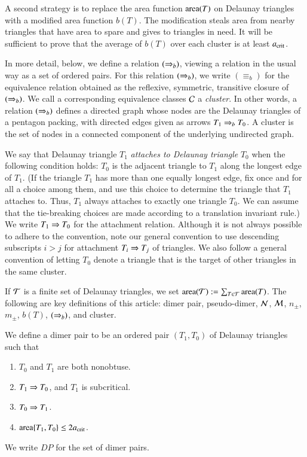 A second strategy is to replace the area function ${\operatorname{area}}(T)$ on
Delaunay triangles with a modified area function $b(T)$.  The
modification steals area from nearby triangles that have area to spare
and gives to triangles in need.  It will be sufficient to prove that
the average of $b(T)$ over each cluster is at least $a_\text{crit}$.

In more detail, below, we define a  relation $(\Rightarrow_{b})$, viewing
a relation in the usual way as a set of ordered pairs.  For 
this relation $(\Rightarrow_{b})$, we write ${(\equiv_{b})}$ for the equivalence
relation obtained as the reflexive, symmetric, transitive closure of
$(\Rightarrow_{b})$.  We call a corresponding equivalence classes $\mathcal C$ a
{\it cluster}.  In other words, a relation $(\Rightarrow_{b})$ defines a directed
graph whose nodes are the Delaunay triangles of a pentagon packing,
with directed edges given as arrows $T_1\Rightarrow_{b} T_0$.  A cluster
is the set of nodes in a connected component of the underlying
undirected graph.

We say that Delaunay triangle $T_1$ {\it attaches to Delaunay
  triangle} $T_0$ when the following condition holds: $T_0$ is the
adjacent triangle to $T_1$ along the longest edge of $T_1$.  (If the
triangle $T_1$ has more than one equally longest edge, fix once and
for all a choice among them, and use this choice to determine the
triangle that $T_1$ attaches to.  Thus, $T_1$ always attaches to
exactly one triangle $T_0$.  We can assume that the tie-breaking
choices are made according to a translation invariant rule.)  We write
$T_1 \Rightarrow T_0$ for the attachment relation.  Although it is not always
possible to adhere to the convention, note our general convention to
use descending subscripts $i > j$ for attachment $T_i\Rightarrow T_j$ of
triangles.  We also follow a general convention of letting $T_0$ denote
a triangle that is the target of other triangles in the same cluster.

If $\mathcal T$ is a finite set of Delaunay triangles, we set
${\operatorname{area}}(\mathcal T):=\sum_{T\in\mathcal T} {\operatorname{area}}(T)$.  The following are key
definitions of this article: dimer pair, pseudo-dimer, $\mathcal N$, $\mathcal M$,
$n_\pm$, $m_\pm$, $b(T)$, $(\Rightarrow_{b})$, and cluster.

\begin{definition}
  We define a dimer pair to be an ordered pair $(T_1,T_0)$ of Delaunay
  triangles such that
\begin{enumerate}
\item $T_0$ and $T_1$ are both nonobtuse.
\item $T_1\Rightarrow T_0$, and $T_1$ is subcritical.
\item $T_0 \Rightarrow T_1$.
\item ${\operatorname{area}}\{T_1,T_0\} \le 2a_\text{crit}$.
\end{enumerate}
We write $DP$ for the set of dimer pairs.
\end{definition}

